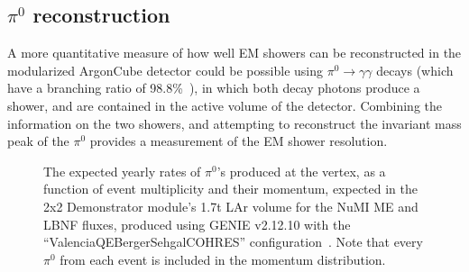 \subsection{$\pi^{0}$ reconstruction}
A more quantitative measure of how well EM showers can be reconstructed in the modularized ArgonCube detector could be possible using $\pi^{0} \rightarrow \gamma\gamma$ decays (which have a branching ratio of 98.8\%~\cite{pdg_2018}), in which both decay photons produce a shower, and are contained in the active volume of the detector. Combining the information on the two showers, and attempting to reconstruct the invariant mass peak of the $\pi^{0}$ provides a measurement of the EM shower resolution.

\begin{figure}[htb]
  \centering
  \caption{The expected yearly rates of $\pi^{0}$'s produced at the vertex, as a function of event multiplicity and their momentum, expected in the 2x2 Demonstrator module's 1.7t LAr volume for the NuMI ME and LBNF fluxes, produced using GENIE v2.12.10 with the ``ValenciaQEBergerSehgalCOHRES'' configuration~\cite{genie}. Note that every $\pi^{0}$ from each event is included in the momentum distribution.}
  \label{fig:pi0_kinematics}
\end{figure}

